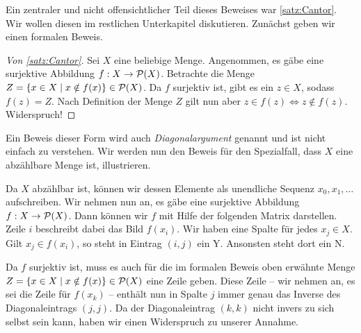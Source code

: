 Ein zentraler und nicht offensichtlicher Teil dieses Beweises war \autoref{satz:Cantor}.
Wir wollen diesen im restlichen Unterkapitel diskutieren.
Zunächst geben wir einen formalen Beweis.

\begin{proof}[Von \autoref{satz:Cantor}]
Sei $X$ eine beliebige Menge.
Angenommen, es gäbe eine surjektive Abbildung $f:X\rightarrow\mathcal{P}(X)$.
Betrachte die Menge $Z=\{x\in X\mid x\notin f(x)\}\in\mathcal{P}(X)$.
Da $f$ surjektiv ist, gibt es ein $z\in X$, sodass $f(z)=Z$.
Nach Definition der Menge $Z$ gilt nun aber $z\in f(z)\Leftrightarrow z\notin f(z)$. Widerspruch!
\end{proof}

Ein Beweis dieser Form wird auch \emph{Diagonalargument} genannt und ist nicht einfach zu verstehen.
Wir werden nun den Beweis für den Spezialfall, dass $X$ eine abzählbare Menge ist, illustrieren.

Da $X$ abzählbar ist, können wir dessen Elemente als unendliche Sequenz $x_0,x_1,\ldots$ aufschreiben.
Wir nehmen nun an, es gäbe eine surjektive Abbildung $f:X\rightarrow\mathcal{P}(X)$.
Dann können wir $f$ mit Hilfe der folgenden Matrix darstellen.
Zeile $i$ beschreibt dabei das Bild $f(x_i)$. 
Wir haben eine Spalte für jedes $x_j\in X$.
Gilt $x_j\in f(x_i)$, so steht in Eintrag $(i,j)$ ein Y. Ansonsten steht dort ein N.

Da $f$ surjektiv ist, muss es auch für die im formalen Beweis oben erwähnte Menge $Z=\{x\in X\mid x\notin f(x)\}\in\mathcal{P}(X)$ eine Zeile geben.
Diese Zeile -- wir nehmen an, es sei die Zeile für $f(x_k)$ -- enthält nun in Spalte $j$ immer genau das Inverse des Diagonaleintrags $(j, j)$.
Da der Diagonaleintrag $(k,k)$ nicht invers zu sich selbst sein kann, haben wir einen Widerspruch zu unserer Annahme.


